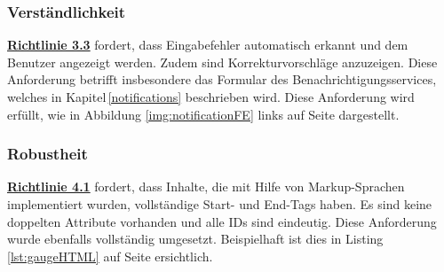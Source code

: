 \subsubsection{Verständlichkeit}
\href{https://www.w3.org/Translations/WCAG20-de/#minimize-error}{\textbf{Richtlinie 3.3}} fordert, dass Eingabefehler automatisch erkannt und dem Benutzer angezeigt werden. Zudem sind Korrekturvorschläge anzuzeigen. Diese Anforderung betrifft insbesondere das Formular des Benachrichtigungsservices, welches in Kapitel\,\ref{notifications} beschrieben wird. Diese Anforderung wird erfüllt, wie in Abbildung \ref{img:notificationFE} links auf Seite \pageref{img:notificationFE} dargestellt.


\subsubsection{Robustheit}
\href{https://www.w3.org/Translations/WCAG20-de/#ensure-compat}{\textbf{Richtlinie 4.1}} fordert, dass Inhalte, die mit Hilfe von Markup-Sprachen implementiert wurden,  vollständige Start- und End-Tags haben. Es sind keine doppelten Attribute vorhanden und alle IDs sind eindeutig. Diese Anforderung wurde ebenfalls vollständig umgesetzt. Beispielhaft ist dies in Listing \ref{lst:gaugeHTML} auf Seite \pageref{lst:gaugeHTML} ersichtlich.
